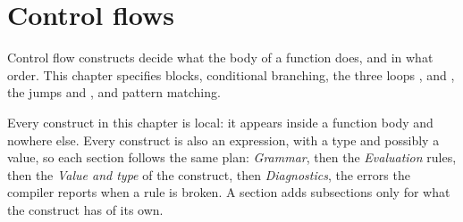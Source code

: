 \chapter{Control flows}%

\label{chap:flow}

Control flow constructs decide what the body of a function does, and in what
order. This chapter specifies blocks, conditional branching, the three loops
,  and , the jumps  and
, and pattern matching. 

Every construct in this chapter is local: it appears inside a function body and
nowhere else. Every construct is also an expression, with a type and possibly a
value, so each section follows the same plan: \textit{Grammar}, then the
\textit{Evaluation} rules, then the \textit{Value and type} of the construct,
then \textit{Diagnostics}, the errors the compiler reports when a rule is
broken. A section adds subsections only for what the construct has of its own.

\minitoc%








